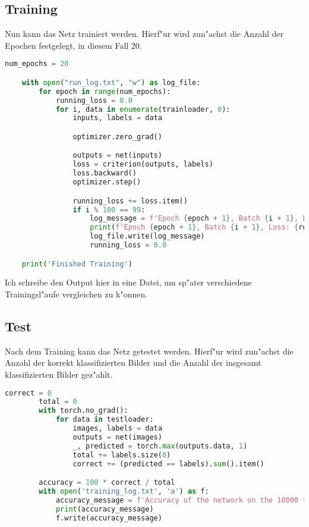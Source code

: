 \documentclass[a4paper,11pt,titlepage]{article}
\begin{document}
    \subsection{Training}
    Nun kann das Netz trainiert werden. Hierf"ur wird zun"achst die Anzahl der Epochen festgelegt, in diesem Fall 20.
    \begin{lstlisting}[language=Python]
        num_epochs = 20

    with open("run_log.txt", "w") as log_file:
        for epoch in range(num_epochs):
            running_loss = 0.0
            for i, data in enumerate(trainloader, 0):
                inputs, labels = data

                optimizer.zero_grad()

                outputs = net(inputs)
                loss = criterion(outputs, labels)
                loss.backward()
                optimizer.step()

                running_loss += loss.item()
                if i % 100 == 99:
                    log_message = f'Epoch {epoch + 1}, Batch {i + 1}, Loss: {running_loss / 100:.3f}\n'
                    print(f'Epoch {epoch + 1}, Batch {i + 1}, Loss: {running_loss / 100:.3f}')
                    log_file.write(log_message)
                    running_loss = 0.0

    print('Finished Training')
    \end{lstlisting}
    Ich schreibe den Output hier in eine Datei, um sp"ater verschiedene Trainingsl"aufe vergleichen zu k"onnen.

    \subsection{Test}
    Nach dem Training kann das Netz getestet werden. Hierf"ur wird zun"achst die Anzahl der korrekt klassifizierten Bilder und die Anzahl der insgesamt klassifizierten Bilder gez"ahlt.
    \begin{lstlisting}[language=Python]
        correct = 0
        total = 0
        with torch.no_grad():
            for data in testloader:
                images, labels = data
                outputs = net(images)
                _, predicted = torch.max(outputs.data, 1)
                total += labels.size(0)
                correct += (predicted == labels).sum().item()

        accuracy = 100 * correct / total
        with open('training_log.txt', 'a') as f:
            accuracy_message = f'Accuracy of the network on the 10000 test images with Adam optimizer and 20 epochs: {accuracy:.2f} %\n'
            print(accuracy_message)
            f.write(accuracy_message)
    \end{lstlisting}
\end{document}
